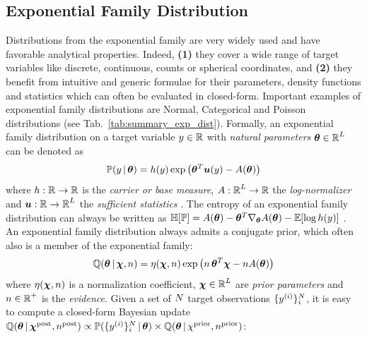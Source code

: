 \subsection{Exponential Family Distribution}
Distributions from the exponential family are very widely used and have favorable analytical properties. Indeed, \textbf{(1)} they cover a wide range of target variables like discrete, continuous, counts or spherical coordinates, and \textbf{(2)} they benefit from intuitive and generic formulae for their parameters, density functions and statistics which can often be evaluated in closed-form. Important examples of exponential family distributions are Normal, Categorical and Poisson distributions (see Tab.~\ref{tab:summary_exp_dist}). Formally, an exponential family distribution on a target variable $y \in \operatorname{\mathbb{R}}$ with \emph{natural parameters} $\bm{\theta} \in \operatorname{\mathbb{R}}^L$ can be denoted as
%
\begin{equation}\label{eq:exponential-family}
    \operatorname{\mathbb{P}}(y \,|\, \bm{\theta}) = h(y) \exp\left(\bm{\theta}^T \bm{u}(y) - A(\bm{\theta})\right)
\end{equation}
%
where ${h: \operatorname{\mathbb{R}} \rightarrow \operatorname{\mathbb{R}}}$ is the \emph{carrier or base measure}, ${A: \operatorname{\mathbb{R}}^L \rightarrow \operatorname{\mathbb{R}}}$ the \emph{log-normalizer} and ${\bm{u}: \operatorname{\mathbb{R}} \rightarrow \operatorname{\mathbb{R}}^L}$ the \emph{sufficient statistics} \citep{bishop,exponential-entropy}. The entropy of an exponential family distribution can always be written as $\operatorname{\mathbb{H}}[\operatorname{\mathbb{P}}] = A(\bm{\theta}) - \bm{\theta}^T \nabla_{\bm{\theta}}A(\bm{\theta}) - \operatorname{\mathbb{E}}[\log{h(y)}]$ \citep{exponential-entropy}.
An exponential family distribution always admits a conjugate prior, which often also is a member of the exponential family:
%
\begin{equation}\label{eq:prior}
    \operatorname{\mathbb{Q}}(\bm{\theta} \,|\, \bm{\chi}, n) = \eta(\bm{\chi}, n) \exp\left( n \, \bm{\theta}^T\bm{\chi}  - n A(\bm{\theta}) \right)
\end{equation}
%
where $\eta(\bm{\chi}, n)$ is a normalization coefficient, $\bm{\chi} \in \operatorname{\mathbb{R}}^L$ are \emph{prior parameters} and $n \in \operatorname{\mathbb{R}}^+$ is the \emph{evidence}. Given a set of $N$ target observations $\{y^{(i)}\}_{i}^{N}$, it is easy to compute a closed-form Bayesian update $\operatorname{\mathbb{Q}}(\bm{\theta} \,|\, \bm{\chi}^\text{post}, n^\text{post}) \propto \operatorname{\mathbb{P}}(\{y^{(i)}\}_{i}^{N} \,|\, \bm{\theta}) \times \operatorname{\mathbb{Q}}(\bm{\theta} \,|\, \chi^\text{prior}, n^\text{prior})$:
